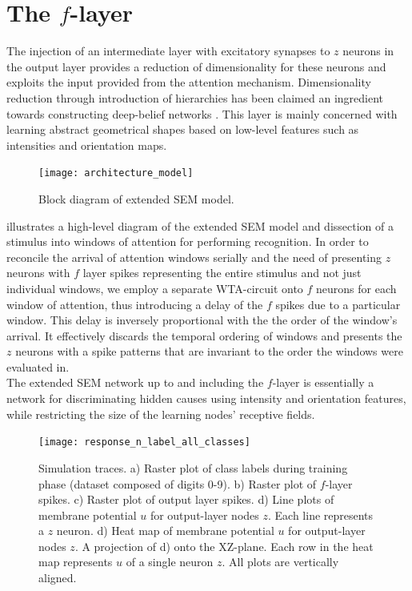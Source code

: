 \documentclass{report}
\begin{document}
\section{The $f$-layer}

The injection of an intermediate layer with excitatory synapses to $z$ neurons in the output layer provides a reduction of dimensionality for these neurons and exploits the input provided from the attention mechanism. Dimensionality reduction through introduction of hierarchies has been claimed an ingredient towards constructing deep-belief networks \cite{Hinton2006}. This layer is mainly concerned with learning abstract geometrical shapes based on low-level features such as intensities and orientation maps.\\

\begin{figure}[ht]
\centering
\texttt{[image: architecture\_model]}
\caption{Block diagram of extended SEM model.
\label{fig:architecture_model}}
\end{figure}

 illustrates a high-level diagram of the extended SEM model and dissection of a stimulus into windows of attention for performing recognition. In order to reconcile the arrival of attention windows serially and the need of presenting $z$ neurons with $f$ layer spikes representing the entire stimulus and not just individual windows, we employ a separate WTA-circuit onto $f$ neurons for each window of attention, thus introducing a delay of the $f$ spikes due to a particular window. This delay is inversely proportional with the the order of the window's arrival. It effectively discards the temporal ordering of windows and presents the $z$ neurons with a spike patterns that are invariant to the order the windows were evaluated in.\\

The extended SEM network up to and including the $f$-layer is essentially a network for discriminating hidden causes using intensity and orientation features, while restricting the size of the learning nodes' receptive fields.\\

\begin{figure}[ht]
\centering
\texttt{[image: response\_n\_label\_all\_classes]}
\caption{Simulation traces. a) Raster plot of class labels during training phase (dataset composed of digits 0-9). b) Raster plot of $f$-layer spikes. c) Raster plot of output layer spikes. d) Line plots of membrane potential $u$ for output-layer nodes $z$. Each line represents a $z$ neuron. d) Heat map of membrane potential $u$ for output-layer nodes $z$. A projection of d) onto the XZ-plane. Each row in the heat map represents $u$ of a single neuron $z$. All plots are vertically aligned.
\label{fig:response_n_label_all_classes}}
\end{figure}
\end{document}
